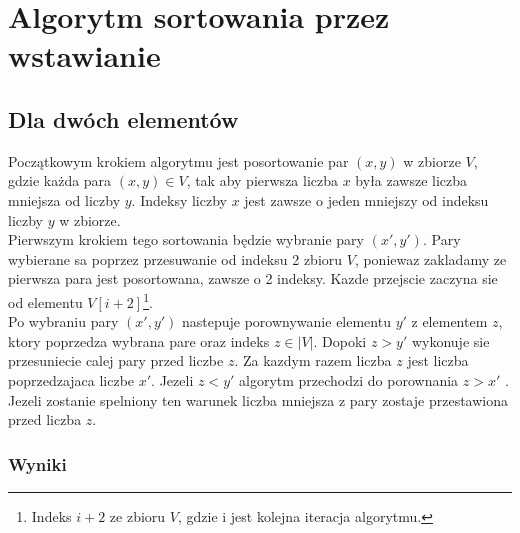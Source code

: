 \section{Algorytm sortowania przez wstawianie}

\subsection*{Dla dwóch elementów}

Początkowym krokiem algorytmu jest posortowanie  par $(x,y) $ w zbiorze $V  $, gdzie każda para $(x,y) \in V$,  tak aby pierwsza liczba $x$  była zawsze liczba mniejsza od liczby $y$. Indeksy liczby $x$ jest zawsze o jeden mniejszy od indeksu liczby $y$ w zbiorze.\\
 Pierwszym krokiem tego sortowania będzie wybranie  pary $(x',y')$. Pary wybierane sa poprzez przesuwanie od indeksu 2 zbioru $V$, poniewaz zakladamy ze pierwsza para jest posortowana, zawsze o 2 indeksy. Kazde przejscie zaczyna sie od elementu $V[i+2]$\footnote{Indeks $i+2$ ze zbioru $V$, gdzie i jest kolejna iteracja algorytmu.}.\\
Po wybraniu pary $(x',y')$ nastepuje porownywanie elementu $y'$ z elementem $z$, ktory poprzedza wybrana pare oraz indeks $z \in \lvert V \rvert $. Dopoki  $z > y'$  wykonuje sie przesuniecie calej pary przed liczbe $z$. Za kazdym razem liczba $z$ jest liczba poprzedzajaca liczbe $x'$.
Jezeli  $z < y'$ algorytm przechodzi do porownania $z > x'$ . Jezeli zostanie spelniony ten warunek liczba mniejsza z pary zostaje przestawiona przed liczba $z$. 
\subsubsection*{Wyniki}
\newpage
